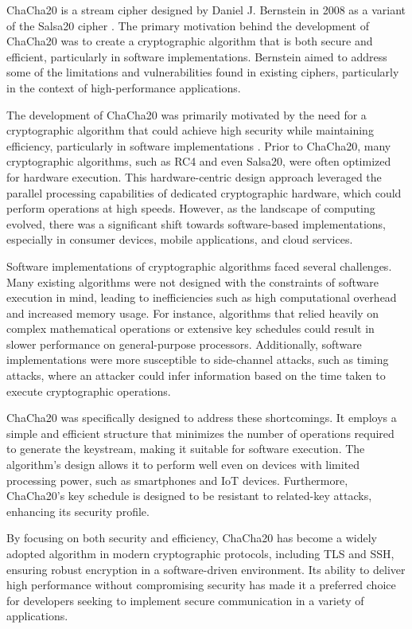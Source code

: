 \documentclass[a4paper,12pt]{report}
\begin{document}
ChaCha20 is a stream cipher designed by Daniel J. Bernstein in 2008 as a variant of the Salsa20 cipher \cite{bernstein2008chacha}.
The primary motivation behind the development of ChaCha20 was to create a cryptographic algorithm that is both secure and efficient, particularly in software implementations.
Bernstein aimed to address some of the limitations and vulnerabilities found in existing ciphers, particularly in the context of high-performance applications.

The development of ChaCha20 was primarily motivated by the need for a cryptographic algorithm that could achieve high security while maintaining efficiency, particularly in software implementations \cite{wikipedia_chacha20_poly1305}.
Prior to ChaCha20, many cryptographic algorithms, such as RC4 and even Salsa20, were often optimized for hardware execution.
This hardware-centric design approach leveraged the parallel processing capabilities of dedicated cryptographic hardware, which could perform operations at high speeds.
However, as the landscape of computing evolved, there was a significant shift towards software-based implementations, especially in consumer devices, mobile applications, and cloud services.

Software implementations of cryptographic algorithms faced several challenges.
Many existing algorithms were not designed with the constraints of software execution in mind, leading to inefficiencies such as high computational overhead and increased memory usage.
For instance, algorithms that relied heavily on complex mathematical operations or extensive key schedules could result in slower performance on general-purpose processors.
Additionally, software implementations were more susceptible to side-channel attacks, such as timing attacks, where an attacker could infer information based on the time taken to execute cryptographic operations.

ChaCha20 was specifically designed to address these shortcomings.
It employs a simple and efficient structure that minimizes the number of operations required to generate the keystream, making it suitable for software execution.
The algorithm's design allows it to perform well even on devices with limited processing power, such as smartphones and IoT devices.
Furthermore, ChaCha20's key schedule is designed to be resistant to related-key attacks, enhancing its security profile.

By focusing on both security and efficiency, ChaCha20 has become a widely adopted algorithm in modern cryptographic protocols, including TLS and SSH, ensuring robust encryption in a software-driven environment.
Its ability to deliver high performance without compromising security has made it a preferred choice for developers seeking to implement secure communication in a variety of applications.
\end{document}
